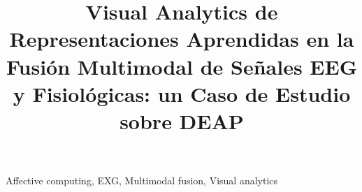 \documentclass[fleqn]{jaes}
\begin{document}

\title{Visual Analytics de Representaciones Aprendidas en la Fusión Multimodal de Señales EEG y Fisiológicas: un Caso de Estudio sobre DEAP}


\maketitle

\begin{keywords}
Affective computing, EXG, Multimodal fusion, Visual analytics
\end{keywords}

















\end{document}

